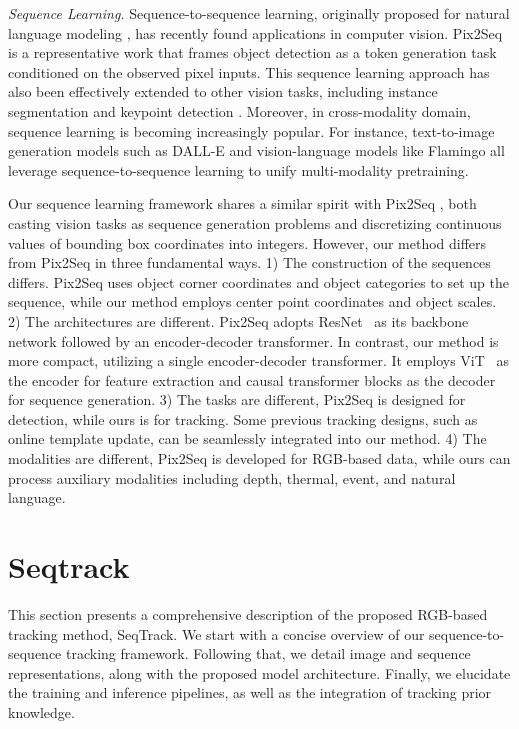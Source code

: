 \textit{Sequence Learning.}
Sequence-to-sequence learning, originally proposed for natural language modeling \cite{sutskever2014sequence, cho2014learning}, has recently found applications in computer vision. 
Pix2Seq \cite{pix2seq} is a representative work that frames object detection as a token generation task conditioned on the observed pixel inputs. This sequence learning approach has also been effectively extended to other vision tasks, including instance segmentation and keypoint detection \cite{pix2seqv2}. Moreover, in cross-modality domain, sequence learning is becoming increasingly popular. For instance, text-to-image generation models such as DALL-E \cite{dalle} and vision-language models like Flamingo \cite{flamingo} all leverage sequence-to-sequence learning to unify multi-modality pretraining.

Our sequence learning framework shares a similar spirit with  Pix2Seq \cite{pix2seq}, both casting vision tasks as sequence generation problems and discretizing continuous values of bounding box coordinates into integers. However, our method differs from Pix2Seq in three fundamental ways. 
1) The construction of the sequences differs. Pix2Seq uses object corner coordinates and object categories to set up the sequence, while our method employs center point coordinates and object scales.  
2) The architectures are different. Pix2Seq adopts ResNet~\cite{ResNet} as its backbone network followed by an encoder-decoder transformer. In contrast, our method is more compact, utilizing a single encoder-decoder transformer. It employs ViT~\cite{ViT} as the encoder for feature extraction and causal transformer blocks as the decoder for sequence generation.
3) The tasks are different, Pix2Seq is designed for detection, while ours is for tracking.
Some previous tracking designs, such as online template update, can be seamlessly integrated into our method. 
4) The modalities are different, Pix2Seq is developed for RGB-based data, while ours can process auxiliary modalities including depth, thermal, event, and natural language.

\section{Seqtrack}
\label{sec:SeqTrack}
This section presents a comprehensive description of the proposed RGB-based tracking method, SeqTrack.
We start with a concise overview of our sequence-to-sequence tracking framework. Following that, we detail image and sequence representations, along with the proposed model architecture. Finally, we elucidate the training and inference pipelines, as well as the integration of tracking prior knowledge.

